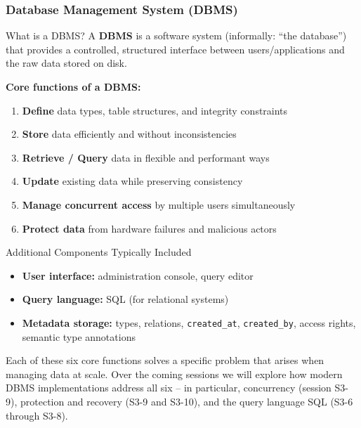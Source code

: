 \begin{frame}
  \frametitle{Database Management System (DBMS)}

  \begin{block}{What is a DBMS?}
    A \textbf{DBMS} is a software system (informally: ``the database'') that provides a controlled, structured interface between users/applications and the raw data stored on disk.
  \end{block}

  \vspace{0.3em}
  \textbf{Core functions of a DBMS:}
  \begin{enumerate}
    \item \textbf{Define} data types, table structures, and integrity constraints
    \item \textbf{Store} data efficiently and without inconsistencies
    \item \textbf{Retrieve / Query} data in flexible and performant ways
    \item \textbf{Update} existing data while preserving consistency
    \item \textbf{Manage concurrent access} by multiple users simultaneously
    \item \textbf{Protect data} from hardware failures and malicious actors
  \end{enumerate}

  \vspace{0.3em}
  \begin{block}{Additional Components Typically Included}
    \begin{itemize}
      \item \textbf{User interface:} administration console, query editor
      \item \textbf{Query language:} SQL (for relational systems)
      \item \textbf{Metadata storage:} types, relations, \texttt{created\_at}, \texttt{created\_by}, access rights, semantic type annotations
    \end{itemize}
  \end{block}

  Each of these six core functions solves a specific problem that arises when managing data at scale. Over the coming sessions we will explore how modern DBMS implementations address all six -- in particular, concurrency (session S3-9), protection and recovery (S3-9 and S3-10), and the query language SQL (S3-6 through S3-8).
\end{frame}

